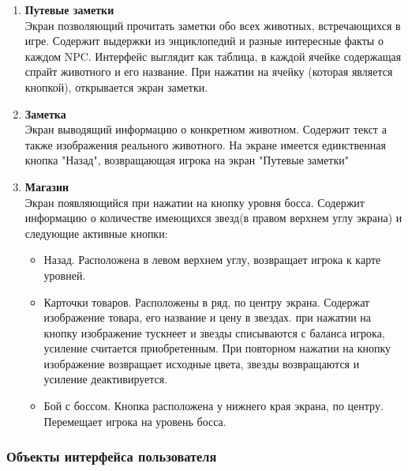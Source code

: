 \documentclass{article}
\begin{document}
\begin{enumerate}
    \item \textbf{Путевые заметки}
    \\Экран позволяющий прочитать заметки обо всех животных, встречающихся в игре. Содержит выдержки из энциклопедий и разные интересные факты о каждом NPC. Интерфейс выглядит как таблица, в каждой ячейке содержащая спрайт животного и его название. При нажатии на ячейку (которая является кнопкой), открывается экран заметки.

    \item \textbf{Заметка}
    \\Экран выводящий информацию о конкретном животном. Содержит текст а также изображения реального животного. На экране имеется единственная кнопка "Назад", возвращающая игрока на экран "Путевые заметки"

    \item \textbf{Магазин}
    \\Экран появляющийся при нажатии на кнопку уровня босса. Содержит информацию о количестве имеющихся звезд(в правом верхнем углу экрана) и следующие активные кнопки:
    \begin{itemize}
        \item Назад. Расположена в левом верхнем углу, возвращает игрока к карте уровней.
        \item Карточки товаров. Расположены в ряд, по центру экрана. Содержат изображение товара, его название и цену в звездах. при нажатии на кнопку изображение тускнеет и звезды списываются с баланса игрока, усиление считается приобретенным. При повторном нажатии на кнопку изображение возвращает исходные цвета, звезды возвращаются и усиление деактивируется.
        \item Бой с боссом. Кнопка расположена у нижнего края экрана, по центру. Перемещает игрока на уровень босса.
    \end{itemize}
\end{enumerate}

\subsubsection{Объекты интерфейса пользователя}
\end{document}
